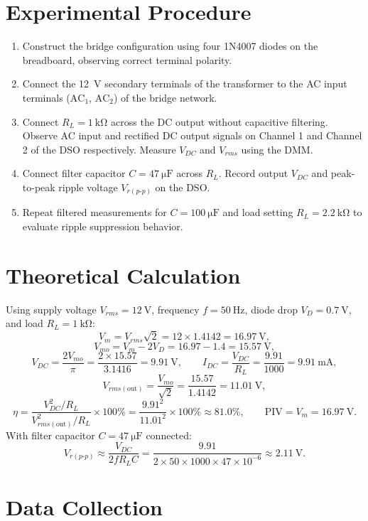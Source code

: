 \section{Experimental Procedure}
\begin{enumerate}
	\item Construct the bridge configuration using four 1N4007 diodes on the breadboard, observing correct terminal polarity.
	\item Connect the \qty{12}{\volt} secondary terminals of the transformer to the AC input terminals ($\text{AC}_1$, $\text{AC}_2$) of the bridge network.
	\item Connect $R_L=\qty{1}{\kilo\ohm}$ across the DC output without capacitive filtering. Observe AC input and rectified DC output signals on Channel 1 and Channel 2 of the DSO respectively. Measure $V_{DC}$ and $V_{rms}$ using the DMM.
	\item Connect filter capacitor $C=\qty{47}{\micro\farad}$ across $R_L$. Record output $V_{DC}$ and peak-to-peak ripple voltage $V_{r(p\text{-}p)}$ on the DSO.
	\item Repeat filtered measurements for $C=\qty{100}{\micro\farad}$ and load setting $R_L=\qty{2.2}{\kilo\ohm}$ to evaluate ripple suppression behavior.
\end{enumerate}

\section{Theoretical Calculation}
Using supply voltage $V_{rms}=\qty{12}{\volt}$, frequency $f=\qty{50}{\hertz}$, diode drop $V_D=\qty{0.7}{\volt}$, and load $R_L=\qty{1}{\kilo\ohm}$:
\[
V_m = V_{rms}\sqrt{2} = 12 \times 1.4142 = \qty{16.97}{\volt},
\]
\[
V_{mo} = V_m - 2V_D = 16.97 - 1.4 = \qty{15.57}{\volt},
\]
\[
V_{DC} = \frac{2V_{mo}}{\pi} = \frac{2 \times 15.57}{3.1416} = \qty{9.91}{\volt}, \qquad
I_{DC} = \frac{V_{DC}}{R_L} = \frac{9.91}{1000} = \qty{9.91}{\milli\ampere},
\]
\[
V_{rms(\text{out})} = \frac{V_{mo}}{\sqrt{2}} = \frac{15.57}{1.4142} = \qty{11.01}{\volt},
\]
\[
\eta = \frac{V_{DC}^2 / R_L}{V_{rms(\text{out})}^2 / R_L} \times 100\% = \frac{9.91^2}{11.01^2} \times 100\% \approx 81.0\%, \qquad \text{PIV} = V_m = \qty{16.97}{\volt}.
\]
With filter capacitor $C = \qty{47}{\micro\farad}$ connected:
\[
V_{r(p\text{-}p)} \approx \frac{V_{DC}}{2fR_LC} = \frac{9.91}{2 \times 50 \times 1000 \times 47 \times 10^{-6}} \approx \qty{2.11}{\volt}.
\]

\section{Data Collection}

